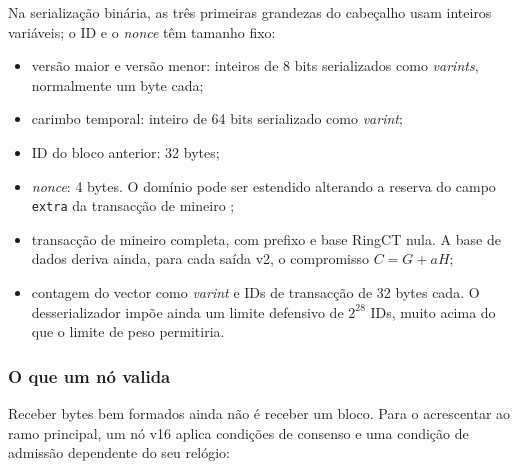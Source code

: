 
Na serialização binária, as três primeiras grandezas do cabeçalho usam
inteiros variáveis; o ID e o {\em nonce} têm tamanho fixo:

\begin{itemize}
\setlength\itemsep{\listspace}
    \item versão maior e versão menor: inteiros de 8 bits serializados como
          {\em varints}, normalmente um byte cada;
    \item carimbo temporal: inteiro de 64 bits serializado como {\em varint};
    \item ID do bloco anterior: 32 bytes;
    \item {\em nonce}: 4 bytes. O domínio pode ser estendido alterando a
          reserva do campo {\tt extra} da transacção de mineiro
          \cite{extra-field-stackexchange};
    \item transacção de mineiro completa, com prefixo e base RingCT nula. A
          base de dados deriva ainda, para cada saída v2, o compromisso
          $C=G+aH$;
    \item contagem do vector como {\em varint} e IDs de transacção de 32 bytes
          cada. O desserializador impõe ainda um limite defensivo de $2^{28}$
          IDs, muito acima do que o limite de peso permitiria.
\end{itemize}

\subsubsection*{O que um nó valida}

%
Receber bytes bem formados ainda não é receber um bloco. Para o acrescentar ao
ramo principal, um nó v16 aplica condições de consenso e uma condição de
admissão dependente do seu relógio:


